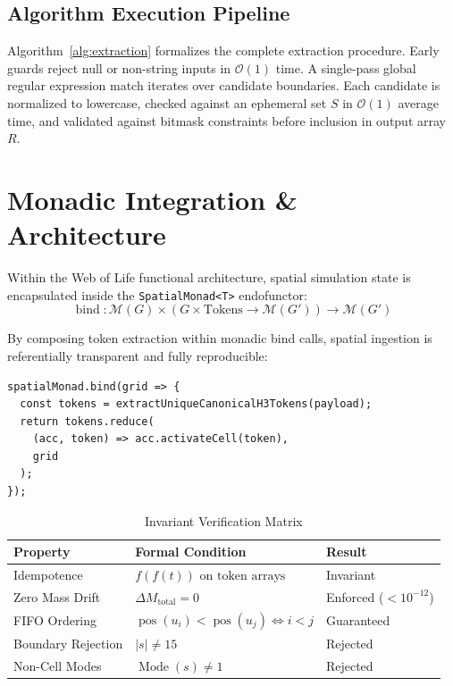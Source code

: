 \documentclass[10pt,journal,compsoc]{IEEEtran}
\begin{document}
\subsection{Algorithm Execution Pipeline}
Algorithm~\ref{alg:extraction} formalizes the complete extraction procedure. Early guards reject null or non-string inputs in $\mathcal{O}(1)$ time. A single-pass global regular expression match iterates over candidate boundaries. Each candidate is normalized to lowercase, checked against an ephemeral set $S$ in $\mathcal{O}(1)$ average time, and validated against bitmask constraints before inclusion in output array $R$.

\section{Monadic Integration & Architecture}

Within the Web of Life functional architecture, spatial simulation state is encapsulated inside the \texttt{SpatialMonad<T>} endofunctor:
\begin{equation}
    \operatorname{bind}: \mathcal{M}(G) \times (G \times \text{Tokens} \to \mathcal{M}(G')) \to \mathcal{M}(G')
\end{equation}

By composing token extraction within monadic bind calls, spatial ingestion is referentially transparent and fully reproducible:

\begin{verbatim}
spatialMonad.bind(grid => {
  const tokens = extractUniqueCanonicalH3Tokens(payload);
  return tokens.reduce(
    (acc, token) => acc.activateCell(token), 
    grid
  );
});
\end{verbatim}

\begin{table}[h]
\centering
\caption{Invariant Verification Matrix}
\label{tab:invariants}
\begin{tabular}{lll}
\toprule
\textbf{Property} & \textbf{Formal Condition} & \textbf{Result} \\
\midrule
Idempotence & $f(f(t)) \text{ on token arrays}$ & Invariant \\
Zero Mass Drift & $\Delta M_{\text{total}} = 0$ & Enforced ($< 10^{-12}$) \\
FIFO Ordering & $\operatorname{pos}(u_i) < \operatorname{pos}(u_j) \iff i < j$ & Guaranteed \\
Boundary Rejection & $|s| \ne 15$ & Rejected \\
Non-Cell Modes & $\operatorname{Mode}(s) \ne 1$ & Rejected \\
\bottomrule
\end{tabular}
\end{table}
\end{document}
